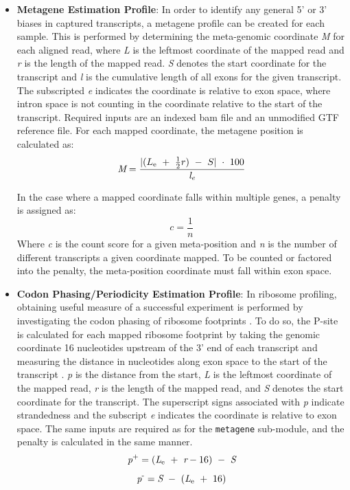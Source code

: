 \documentclass[11pt, a4paper, oneside]{article}
\begin{document}
\begin{enumerate}
\begin{itemize}
      \item \textbf{Metagene Estimation Profile}: In order to identify any general 5' or 3' biases in captured transcripts, a metagene profile can be created for each sample. This is performed by determining the meta-genomic coordinate \textit{M} for each aligned read, where \textit{L} is the leftmost coordinate of the mapped read and \textit{r} is the length of the mapped read. \textit{S} denotes the start coordinate for the transcript and \textit{l} is the cumulative length of all exons for the given transcript. The subscripted \textit{e} indicates the coordinate is relative to exon space, where intron space is not counting in the coordinate relative to the start of the transcript. Required inputs are an indexed bam file and an unmodified GTF reference file. For each mapped coordinate, the metagene position is calculated as:
      \begin{equation}
      \textit{M} = \frac{|(L\textsubscript{e}\ +\ \frac{1}{2}r)\ -\ S|\ \cdot\ 100}{\textit{l\textsubscript{e}}}
      \end{equation}

      In the case where a mapped coordinate falls within multiple genes, a penalty is assigned as:
      \begin{equation}
        \textit{c} = \frac{1}{\textit{n}}
      \end{equation}
      Where \textit{c} is the count score for a given meta-position and \textit{n} is the number of different transcripts a given coordinate mapped. To be counted or factored into the penalty, the meta-position coordinate must fall within exon space.

      \item \textbf{Codon Phasing/Periodicity Estimation Profile}: In ribosome profiling, obtaining useful measure of a successful experiment is performed by investigating the codon phasing of ribosome footprints \cite{}. To do so, the P-site is calculated for each mapped ribosome footprint by taking the genomic coordinate 16 nucleotides upstream of the 3' end of each transcript and measuring the distance in nucleotides along exon space to the start of the transcript \cite{}. \textit{p} is the distance from the start, \textit{L} is the leftmost coordinate of the mapped read, \textit{r} is the length of the mapped read, and \textit{S} denotes the start coordinate for the transcript. The superscript signs associated with \textit{p} indicate strandedness and the subscript \textit{e} indicates the coordinate is relative to exon space. The same inputs are required as for the \texttt{metagene} sub-module, and the penalty is calculated in the same manner.
      \begin{equation}
        \textit{p}\textsuperscript{+} = (\textit{L}\textsubscript{e}\ +\ \textit{r} - 16)\ -\ \textit{S}
      \end{equation}
      \begin{equation}
        \textit{p}\textsuperscript{-} = \textit{S}\ -\ (\textit{L}\textsubscript{e}\ +\ 16)
      \end{equation}

    \end{itemize}
\end{enumerate}
\end{document}
